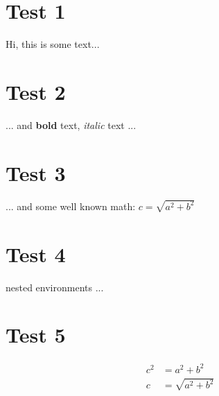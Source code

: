 \documentclass[a4paper,10pt]{scrartcl}
\begin{document}
\section*{Test 1}
Hi, this is some text...

\newpage
\section*{Test 2}
... and \textbf{bold} text,
\textit{italic} text ...

\newpage
\section*{Test 3}
... and some well known math:  $c = \sqrt{a^2 + b^2}$

\newpage
\section*{Test 4}
\begin{center}\begin{itshape}
 nested environments ...
\end{itshape}\end{center}

\newpage
\section*{Test 5}
\begin{align*}
c^2 &= a^2 + b^2 \\
c &= \sqrt{a^2 + b^2}
\end{align*}
\end{document}
